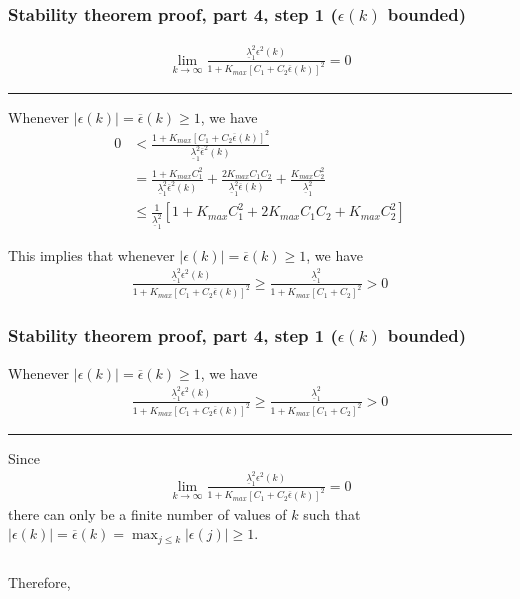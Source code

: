 \begin{frame}
    \frametitle{Stability theorem proof, part 4, step 1 ($\epsilon(k)$ bounded)}

    \begin{align*}
        \lim_{k \rightarrow \infty} \frac{ \underline{\lambda}_1^2 \epsilon^2(k) }
            { 1 + K_{max} [C_1 + C_2 \overline{\epsilon}(k)]^2 } = 0
    \end{align*}
    \hrule{\hfill}

    Whenever $\displaystyle |\epsilon(k)| = \overline{\epsilon}(k) \geq 1$, we have
    \begin{align*}
        0 & < \frac{ 1 + K_{max} [C_1 + C_2 \overline{\epsilon}(k)]^2 }{ \underline{\lambda}_1^2 \overline{\epsilon}^2(k) } \\
        & = \frac{ 1 + K_{max} C_1^2 }{ \underline{\lambda}_1^2 \overline{\epsilon}^2(k) }
            + \frac{ 2 K_{max} C_1 C_2 }{ \underline{\lambda}_1^2 \overline{\epsilon}(k) } 
            + \frac{ K_{max} C_2^2 }{ \underline{\lambda}_1^2 } \\
        & \leq \frac{1}{\underline{\lambda}_1^2 } [1 + K_{max} C_1^2 + 2 K_{max} C_1 C_2 + K_{max} C_2^2]
    \end{align*}
    \paused
    
    This implies that whenever $\displaystyle |\epsilon(k)| = \overline{\epsilon}(k) \geq 1$, we have
    \begin{align*}
        \frac{ \underline{\lambda}_1^2 \epsilon^2(k) }{ 1 + K_{max} [C_1 + C_2 \overline{\epsilon}(k)]^2 } 
            \geq \frac{ \underline{\lambda}_1^2 }{ 1 + K_{max} [C_1 + C_2]^2 } > 0
    \end{align*}

\end{frame} 

\begin{frame}
    \frametitle{Stability theorem proof, part 4, step 1 ($\epsilon(k)$ bounded)}

    Whenever $\displaystyle |\epsilon(k)| = \overline{\epsilon}(k) \geq 1$, we have
    \begin{align*}
        \frac{ \underline{\lambda}_1^2 \epsilon^2(k) }{ 1 + K_{max} [C_1 + C_2 \overline{\epsilon}(k)]^2 }
            \geq \frac{ \underline{\lambda}_1^2 }{ 1 + K_{max} [C_1 + C_2]^2 } > 0
    \end{align*}
    \hrule{\hfill}
    
    Since
    \begin{align*}
        \lim_{k \rightarrow \infty} \frac{ \underline{\lambda}_1^2 \epsilon^2(k) }
            { 1 + K_{max} [C_1 + C_2 \overline{\epsilon}(k)]^2 } = 0
    \end{align*}
    there can only be a finite number of values of $k$ such that $\displaystyle |\epsilon(k)| = \overline{\epsilon}(k) = \max_{j\leq k} |\epsilon(j)| \geq 1$.
    \pause
    
    $\,$
    
    Therefore, 
    
\end{frame}

